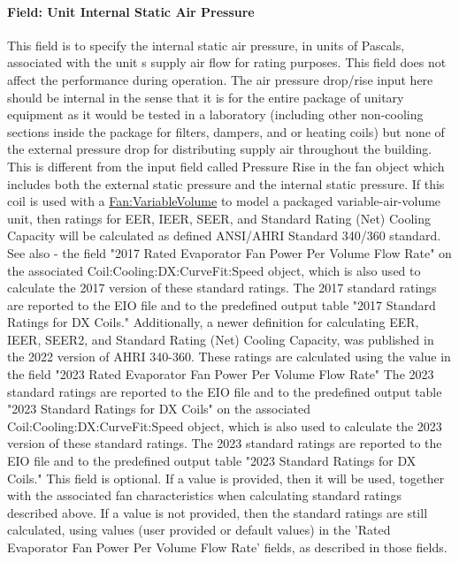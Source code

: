\paragraph{Field: Unit Internal Static Air Pressure}

This field is to specify the internal static air pressure, in units of Pascals, associated with the unit s supply air flow for rating purposes. This field does not affect the performance during operation. The air pressure drop/rise input here should be internal in the sense that it is for the entire package of unitary equipment as it would be tested in a laboratory (including other non-cooling sections inside the package for filters, dampers, and or heating coils) but none of the external pressure drop for distributing supply air throughout the building. This is different from the input field called Pressure Rise in the fan object which includes both the external static pressure and the internal static pressure.
If this coil is used with a \hyperref[fanvariablevolume]{Fan:VariableVolume} to model a packaged variable-air-volume unit, then ratings for  EER, IEER, SEER, and Standard Rating (Net) Cooling Capacity will be calculated as defined ANSI/AHRI Standard 340/360 standard.  See also - the field "2017 Rated Evaporator Fan Power Per Volume Flow Rate" on the associated Coil:Cooling:DX:CurveFit:Speed object, which is also used to calculate the 2017 version of these standard ratings. The 2017 standard ratings are reported to the EIO file and to the predefined output table "2017 Standard Ratings for DX Coils."
Additionally, a newer definition for calculating EER, IEER, SEER2, and Standard Rating (Net) Cooling Capacity, was published in the 2022 version of AHRI 340-360.  These ratings are calculated using the value in the field "2023 Rated Evaporator Fan Power Per Volume Flow Rate"   The 2023 standard ratings are reported to the EIO file and to the predefined output table "2023 Standard Ratings for DX Coils" on the associated Coil:Cooling:DX:CurveFit:Speed object, which is also used to calculate the 2023 version of these standard ratings. The 2023 standard ratings are reported to the EIO file and to the predefined output table "2023 Standard Ratings for DX Coils."
This field is optional. If a value is provided, then it will be used, together with the associated fan characteristics when calculating standard ratings described above. If a value is not provided, then the standard ratings are still calculated, using values (user provided or default values) in the 'Rated Evaporator Fan Power Per Volume Flow Rate' fields, as described in those fields.

